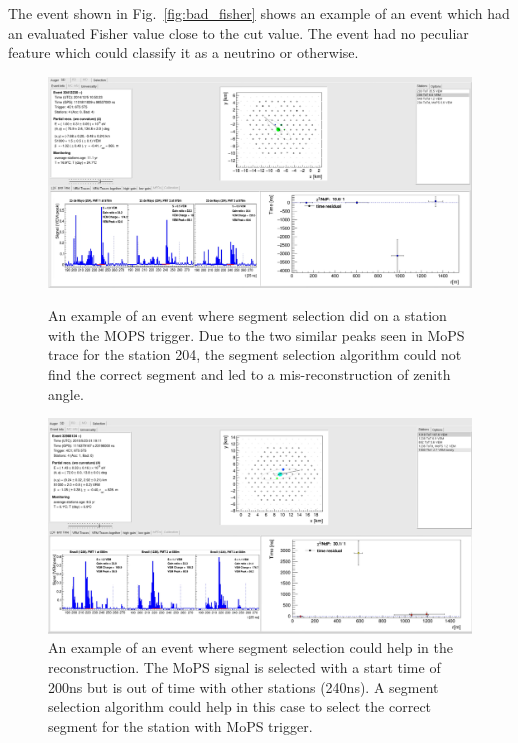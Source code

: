 The event shown in Fig.~\ref{fig:bad_fisher} shows an example of an event which had an evaluated Fisher value close to the cut value. The event had no peculiar feature which could classify it as a neutrino or otherwise.

\begin{figure}[h!]
  \centering
  \includegraphics[width=\textwidth]{thesis_figures/App3/Bad_segment.pdf}
  \caption{An example of an event where segment selection did on a station with the MOPS trigger. Due to the two similar peaks seen in MoPS trace for the station 204, the segment selection algorithm could not find the correct segment and led to a mis-reconstruction of zenith angle.}
  \label{fig:bad_segment_selection}
  \includegraphics[width=\textwidth]{thesis_figures/App3/MoPS_peak_selection.pdf}
  \caption{An example of an event where segment selection could help in the reconstruction. The MoPS signal is selected with a start time of 200ns but is out of time with other stations (240ns). A segment selection algorithm could help in this case to select the correct segment for the station with MoPS trigger.}
  \label{fig:good_segment_selection}

\end{figure}

